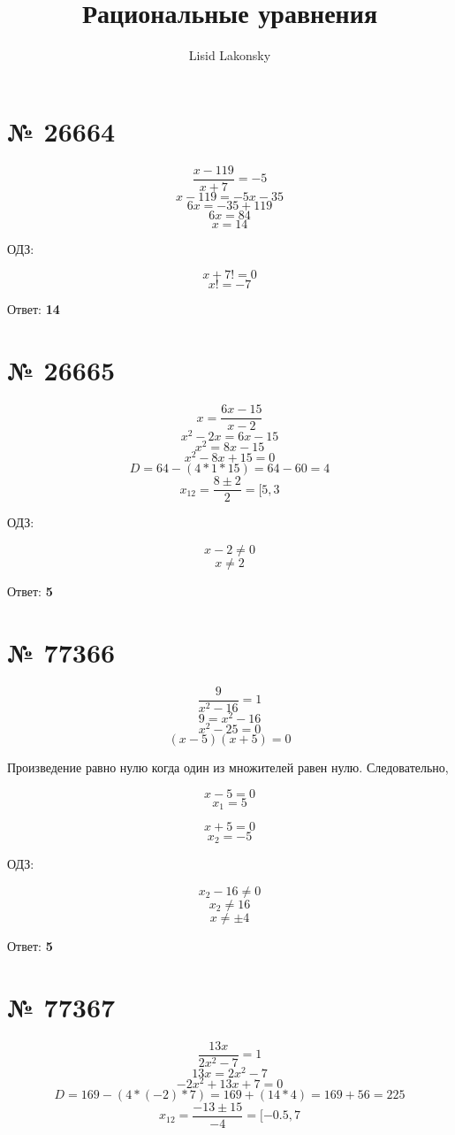 \documentclass[11pt]{article} %
\title{Рациональные уравнения}
\author{Lisid Lakonsky}
\begin{document}
\maketitle

\section{№ \textbf{26664}}

$$ \frac{x - 119}{x + 7} = -5 $$
$$ x - 119 = -5x - 35 $$
$$ 6x = -35 + 119 $$
$$ 6x = 84 $$
$$ x = 14 $$

ОДЗ:

$$ x + 7 != 0 $$
$$ x != -7 $$

Ответ: \textbf{14}

\section{№ \textbf{26665}}

$$ x = \frac{6x - 15}{x - 2} $$
$$ x^2 - 2x = 6x - 15 $$
$$ x^2 = 8x - 15 $$
$$ x^2 - 8x + 15 = 0 $$
$$ D = 64 - (4 * 1 * 15) = 64 - 60 = 4 $$
$$ x_{12} = \frac{8 \pm 2}{2} = [5, 3 $$

ОДЗ:

$$ x - 2 \neq 0 $$
$$ x \neq 2 $$

Ответ: \textbf{5}

\section{№ \textbf{77366}}

$$\frac{9}{x^2 - 16} = 1$$
$$9 = x^2 - 16$$
$$x^2 - 25 = 0$$
$$(x - 5)(x + 5) = 0$$

Произведение равно нулю когда один из множителей равен нулю. Следовательно,

$$x - 5 = 0$$
$$x_1 = 5$$


$$x + 5 = 0$$
$$x_2 = -5$$

ОДЗ:

$$x_2 - 16 \neq 0$$
$$x_2 \neq 16$$
$$x \neq \pm 4$$

Ответ: \textbf{5}

\section{№ \textbf{77367}}

$$\frac{13x}{2x^2 - 7} = 1$$
$$13x = 2x^2 - 7$$
$$-2x^2 + 13x + 7 = 0$$
$$D = 169 - (4 * (-2) * 7) = 169 + (14 * 4) = 169 + 56 = 225$$
$$x_{12} = \frac{-13 \pm 15}{-4} = [-0.5, 7$$
\end{document}
